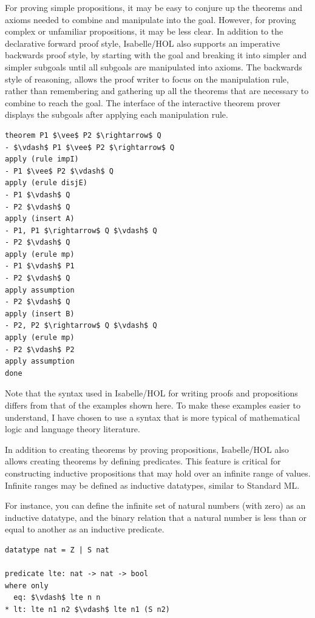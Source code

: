 \documentclass[letterpaper, 11pt]{extarticle}
\begin{document}
For proving simple propositions, it may be easy to conjure up the theorems and axioms needed to
combine and manipulate into the goal. However, for proving complex or unfamiliar propositions,
it may be less clear. In addition to the declarative forward proof style, Isabelle/HOL also
supports an imperative backwards proof style, by starting with the goal and breaking it into simpler
and simpler subgoals until all subgoals are manipulated into axioms. The backwards style of reasoning,
allows the proof
writer to focus on the manipulation rule, rather than remembering and gathering up all the theorems that are
necessary to combine to reach the goal. The interface of the interactive theorem prover displays the subgoals
after applying each manipulation rule.


\begin{lstlisting}[language=logic, mathescape]
theorem P1 $\vee$ P2 $\rightarrow$ Q
- $\vdash$ P1 $\vee$ P2 $\rightarrow$ Q
apply (rule impI)
- P1 $\vee$ P2 $\vdash$ Q
apply (erule disjE)
- P1 $\vdash$ Q
- P2 $\vdash$ Q
apply (insert A)
- P1, P1 $\rightarrow$ Q $\vdash$ Q
- P2 $\vdash$ Q
apply (erule mp)
- P1 $\vdash$ P1
- P2 $\vdash$ Q
apply assumption 
- P2 $\vdash$ Q
apply (insert B)
- P2, P2 $\rightarrow$ Q $\vdash$ Q
apply (erule mp)
- P2 $\vdash$ P2
apply assumption 
done
\end{lstlisting}

Note that the syntax used in Isabelle/HOL for writing proofs and propositions differs from
that of the examples shown here. To make these examples easier to understand, I have chosen
to use a syntax that is more typical of mathematical logic and language theory literature.  

In addition to creating theorems by proving propositions, Isabelle/HOL also allows creating theorems
by defining predicates. This feature is critical for constructing inductive propositions that may hold
over an infinite range of values.  Infinite ranges may be defined as inductive datatypes,
similar to Standard ML.

For instance, you can define the infinite set of natural numbers (with zero) as an inductive datatype,
and the binary relation that a natural number is less than or equal to another as an inductive predicate.

\begin{lstlisting}[language=logic]
datatype nat = Z | S nat

predicate lte: nat -> nat -> bool
where only
  eq: $\vdash$ lte n n
* lt: lte n1 n2 $\vdash$ lte n1 (S n2)
\end{lstlisting}
\end{document}
